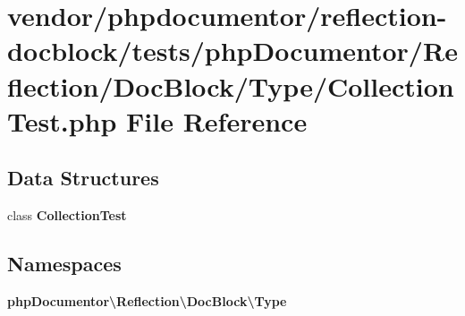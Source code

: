 \section{vendor/phpdocumentor/reflection-\/docblock/tests/php\+Documentor/\+Reflection/\+Doc\+Block/\+Type/\+Collection\+Test.php File Reference}
\label{_collection_test_8php}
\subsection*{Data Structures}
\begin{DoxyCompactItemize}
\item 
class {\bf Collection\+Test}
\end{DoxyCompactItemize}
\subsection*{Namespaces}
\begin{DoxyCompactItemize}
\item 
 {\bf php\+Documentor\textbackslash{}\+Reflection\textbackslash{}\+Doc\+Block\textbackslash{}\+Type}
\end{DoxyCompactItemize}
